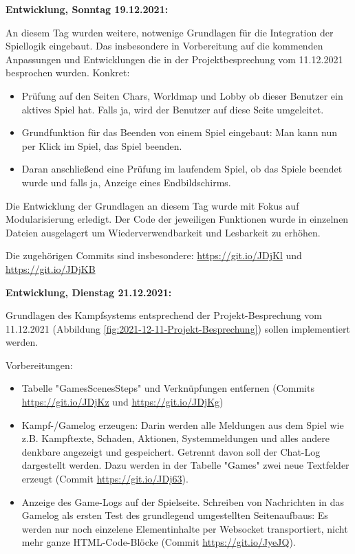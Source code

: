 \textbf{Entwicklung, Sonntag 19.12.2021:}

An diesem Tag wurden weitere, notwenige Grundlagen für die Integration der Spiellogik eingebaut. Das insbesondere in Vorbereitung auf die kommenden Anpassungen und Entwicklungen die in der Projektbesprechung vom 11.12.2021 besprochen wurden. 
Konkret: 

\begin{itemize}
	\item Prüfung auf den Seiten Chars, Worldmap und Lobby ob dieser Benutzer ein aktives Spiel hat. Falls ja, wird der Benutzer auf diese Seite umgeleitet.
	\item Grundfunktion für das Beenden von einem Spiel eingebaut: Man kann nun per Klick im Spiel, das Spiel beenden.
	\item Daran anschließend eine Prüfung im laufendem Spiel, ob das Spiele beendet wurde und falls ja, Anzeige eines Endbildschirms.
\end{itemize}

Die Entwicklung der Grundlagen an diesem Tag wurde mit Fokus auf Modularisierung erledigt. Der Code der jeweiligen Funktionen wurde in einzelnen Dateien ausgelagert um Wiederverwendbarkeit und Lesbarkeit zu erhöhen. 

Die zugehörigen Commits sind insbesondere: 
\url{https://git.io/JDjKl} und 
\url{https://git.io/JDjKB}


\textbf{Entwicklung, Dienstag 21.12.2021:}

Grundlagen des Kampfsystems entsprechend der Projekt-Besprechung vom 11.12.2021 (Abbildung \ref{fig:2021-12-11-Projekt-Besprechung}) sollen implementiert werden.

Vorbereitungen: 

\begin{itemize}
    \item Tabelle "GamesScenesSteps" und Verknüpfungen entfernen (Commits \url{https://git.io/JDjKz} und \url{https://git.io/JDjKg})
    \item Kampf-/Gamelog erzeugen: Darin werden alle Meldungen aus dem Spiel wie z.B. Kampftexte, Schaden, Aktionen, Systemmeldungen und alles andere denkbare angezeigt und gespeichert. Getrennt davon soll der Chat-Log dargestellt werden. Dazu werden in der Tabelle "Games" zwei neue Textfelder erzeugt (Commit \url{https://git.io/JDj63}). 
    \item Anzeige des Game-Logs auf der Spielseite. Schreiben von Nachrichten in das Gamelog als ersten Test des grundlegend umgestellten Seitenaufbaus: Es werden nur noch einzelene Elementinhalte per Websocket transportiert, nicht mehr ganze HTML-Code-Blöcke (Commit \url{https://git.io/JyeJQ}).
\end{itemize}


